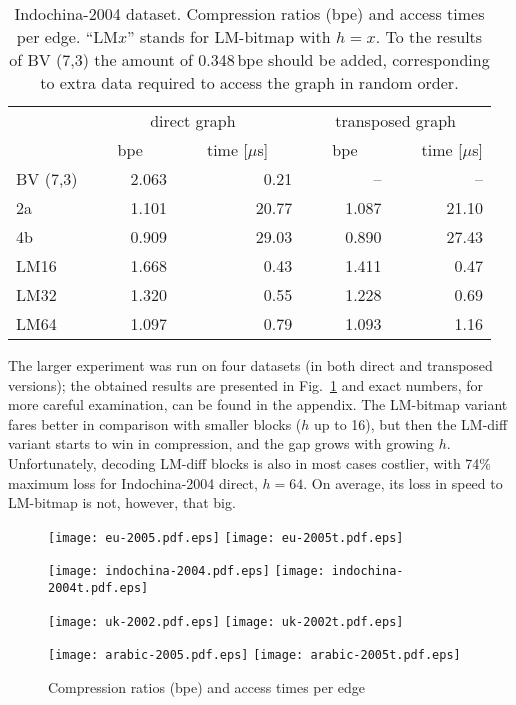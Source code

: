 \documentclass[envcountsame]{llncs}
\begin{document}
\begin{table}
\centering
\begin{tabular}{lrrrr}
\hline
        & \multicolumn{2}{c}{direct graph} & \multicolumn{2}{c}{transposed graph} \\
\cline{2-5}
     ~~~&~~~bpe~~~&~~~time [$\mu$s]~~~&~~~bpe~~~&~~~time [$\mu$s] \\
\hline
BV (7,3) & 2.063 & 0.21 & -- & -- \\
2a & 1.101 & 20.77 & 1.087 & 21.10 \\
4b & 0.909 & 29.03 & 0.890 & 27.43 \\
LM16 & 1.668 & 0.43 & 1.411 & 0.47 \\
LM32 & 1.320 & 0.55 & 1.228 & 0.69 \\
LM64 & 1.097 & 0.79 & 1.093 & 1.16 \\
\hline
\end{tabular}
\vspace{4mm}
\caption{Indochina-2004 dataset. Compression ratios (bpe) and access times per edge.
``LM$x$'' stands for LM-bitmap with $h = x$.
To the results of BV (7,3) the amount of 0.348\,bpe should be added, corresponding 
to extra data required to access the graph in random order.}
\label{table:indochina}
\end{table}

The larger experiment was run on four datasets (in both direct and transposed versions); 
the obtained results are presented in Fig.~\ref{fig:times} and exact numbers, for more 
careful examination, can be found in the appendix.
The LM-bitmap variant fares better in comparison with smaller blocks ($h$ up to 16), 
but then the LM-diff variant starts to win in compression, and the gap grows with 
growing $h$.
Unfortunately, decoding LM-diff blocks is also in most cases costlier, 
with 74\% maximum loss for Indochina-2004 direct, $h = 64$.
On average, its loss in speed to LM-bitmap is not, however, that big.

\begin{figure}[pt]
\centerline{
\texttt{[image: eu-2005.pdf.eps]}
\texttt{[image: eu-2005t.pdf.eps]}
}
\centerline{
\texttt{[image: indochina-2004.pdf.eps]}
\texttt{[image: indochina-2004t.pdf.eps]}
}
\centerline{
\texttt{[image: uk-2002.pdf.eps]}
\texttt{[image: uk-2002t.pdf.eps]}
}
\centerline{
\texttt{[image: arabic-2005.pdf.eps]}
\texttt{[image: arabic-2005t.pdf.eps]}
}
\caption[Results]
{Compression ratios (bpe) and access times per edge}
\label{fig:times}
\end{figure}
\end{document}
